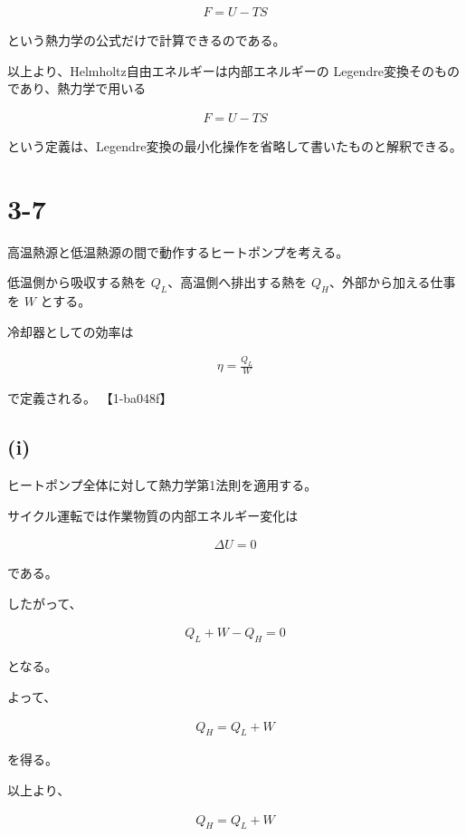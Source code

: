 \documentclass[platex,dvipdfmx,a4paper]{jsarticle}
\begin{document}
\begin{align*}
F=U-TS
\end{align*}

という熱力学の公式だけで計算できるのである。

以上より、Helmholtz自由エネルギーは内部エネルギーの Legendre変換そのものであり、熱力学で用いる

\begin{align*}
F=U-TS
\end{align*}

という定義は、Legendre変換の最小化操作を省略して書いたものと解釈できる。
\section{3-7}

高温熱源と低温熱源の間で動作するヒートポンプを考える。

低温側から吸収する熱を $Q_L$、高温側へ排出する熱を $Q_H$、外部から加える仕事を $W$ とする。

冷却器としての効率は

\begin{align*}
\eta
=
\frac{Q_L}{W}
\end{align*}

で定義される。 【1-ba048f】

\subsection{(i)}

ヒートポンプ全体に対して熱力学第1法則を適用する。

サイクル運転では作業物質の内部エネルギー変化は

\begin{align*}
\Delta U=0
\end{align*}

である。

したがって、

\begin{align*}
Q_L+W-Q_H=0
\end{align*}

となる。

よって、

\begin{align*}
Q_H
=
Q_L+W
\end{align*}

を得る。

以上より、

\begin{align*}
Q_H
=
Q_L+W
\end{align*}
\end{document}
